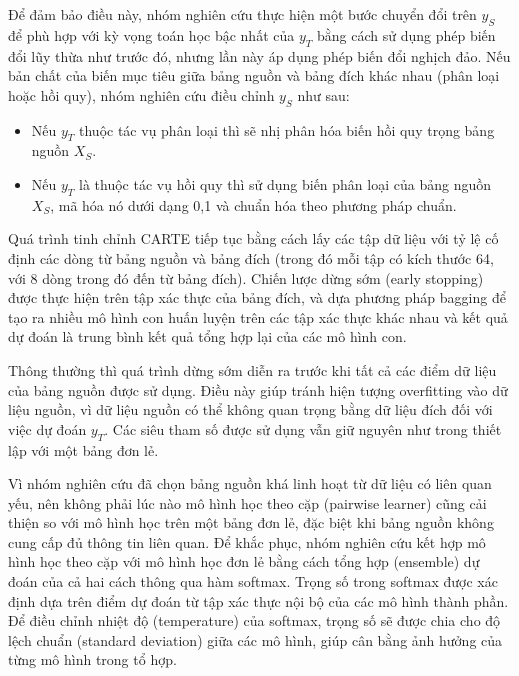 \documentclass{article}
\begin{document}
Để đảm bảo điều này, nhóm nghiên cứu thực hiện một bước chuyển đổi trên $y_S$ để phù hợp với kỳ vọng toán học bậc nhất của $y_T$ bằng cách sử dụng phép biến đổi lũy thừa như trước đó, nhưng lần này áp dụng phép biến đổi nghịch đảo. Nếu bản chất của biến mục tiêu giữa bảng nguồn và bảng đích khác nhau (phân loại hoặc hồi quy), nhóm nghiên cứu điều chỉnh $y_S$ như sau:

\begin{itemize}
    \item Nếu $y_T$ thuộc tác vụ phân loại thì sẽ nhị phân hóa biến hồi quy trọng bảng nguồn $X_S$.
    \item Nếu $y_T$ là thuộc tác vụ hồi quy thì sử dụng biến phân loại của bảng nguồn $X_S$, mã hóa nó dưới dạng {0,1} và chuẩn hóa theo phương pháp chuẩn.
\end{itemize}

Quá trình tinh chỉnh CARTE tiếp tục bằng cách lấy các tập dữ liệu với tỷ lệ cố định các dòng từ bảng nguồn và bảng đích (trong đó mỗi tập có kích thước 64, với 8 dòng trong đó đến từ bảng đích). Chiến lược dừng sớm (early stopping) được thực hiện trên tập xác thực của bảng đích, và dựa phương pháp bagging để tạo ra nhiều mô hình con huấn luyện trên các tập xác thực khác nhau và kết quả dự đoán là trung bình kết quả tổng hợp lại của các mô hình con.

Thông thường thì quá trình dừng sớm diễn ra trước khi tất cả các điểm dữ liệu của bảng nguồn được sử dụng. Điều này giúp tránh hiện tượng overfitting vào dữ liệu nguồn, vì dữ liệu nguồn có thể không quan trọng bằng dữ liệu đích đối với việc dự đoán $y_T$. Các siêu tham số được sử dụng vẫn giữ nguyên như trong thiết lập với một bảng đơn lẻ.

Vì nhóm nghiên cứu đã chọn bảng nguồn khá linh hoạt từ dữ liệu có liên quan yếu, nên không phải lúc nào mô hình học theo cặp (pairwise learner) cũng cải thiện so với mô hình học trên một bảng đơn lẻ, đặc biệt khi bảng nguồn không cung cấp đủ thông tin liên quan. Để khắc phục, nhóm nghiên cứu kết hợp mô hình học theo cặp với mô hình học đơn lẻ bằng cách tổng hợp (ensemble) dự đoán của cả hai cách thông qua hàm softmax. Trọng số trong softmax được xác định dựa trên điểm dự đoán từ tập xác thực nội bộ của các mô hình thành phần. Để điều chỉnh nhiệt độ (temperature) của softmax, trọng số sẽ được chia cho độ lệch chuẩn (standard deviation) giữa các mô hình, giúp cân bằng ảnh hưởng của từng mô hình trong tổ hợp.
\end{document}
